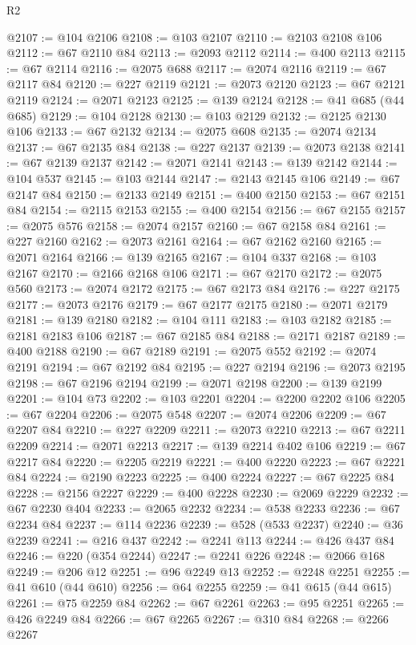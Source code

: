 \begin{lexlean}{R2}
\begin{coremodule}
@2107 := @104 @2106
@2108 := @103 @2107
@2110 := @2103 @2108 @106
@2112 := @67 @2110 @84
@2113 := @2093 @2112
@2114 := @400 @2113
@2115 := @67 @2114
@2116 := @2075 @688
@2117 := @2074 @2116
@2119 := @67 @2117 @84
@2120 := @227 @2119
@2121 := @2073 @2120
@2123 := @67 @2121 @2119
@2124 := @2071 @2123
@2125 := @139 @2124
@2128 := @41 @685 (@44 @685)
@2129 := @104 @2128
@2130 := @103 @2129
@2132 := @2125 @2130 @106
@2133 := @67 @2132
@2134 := @2075 @608
@2135 := @2074 @2134
@2137 := @67 @2135 @84
@2138 := @227 @2137
@2139 := @2073 @2138
@2141 := @67 @2139 @2137
@2142 := @2071 @2141
@2143 := @139 @2142
@2144 := @104 @537
@2145 := @103 @2144
@2147 := @2143 @2145 @106
@2149 := @67 @2147 @84
@2150 := @2133 @2149
@2151 := @400 @2150
@2153 := @67 @2151 @84
@2154 := @2115 @2153
@2155 := @400 @2154
@2156 := @67 @2155
@2157 := @2075 @576
@2158 := @2074 @2157
@2160 := @67 @2158 @84
@2161 := @227 @2160
@2162 := @2073 @2161
@2164 := @67 @2162 @2160
@2165 := @2071 @2164
@2166 := @139 @2165
@2167 := @104 @337
@2168 := @103 @2167
@2170 := @2166 @2168 @106
@2171 := @67 @2170
@2172 := @2075 @560
@2173 := @2074 @2172
@2175 := @67 @2173 @84
@2176 := @227 @2175
@2177 := @2073 @2176
@2179 := @67 @2177 @2175
@2180 := @2071 @2179
@2181 := @139 @2180
@2182 := @104 @111
@2183 := @103 @2182
@2185 := @2181 @2183 @106
@2187 := @67 @2185 @84
@2188 := @2171 @2187
@2189 := @400 @2188
@2190 := @67 @2189
@2191 := @2075 @552
@2192 := @2074 @2191
@2194 := @67 @2192 @84
@2195 := @227 @2194
@2196 := @2073 @2195
@2198 := @67 @2196 @2194
@2199 := @2071 @2198
@2200 := @139 @2199
@2201 := @104 @73
@2202 := @103 @2201
@2204 := @2200 @2202 @106
@2205 := @67 @2204
@2206 := @2075 @548
@2207 := @2074 @2206
@2209 := @67 @2207 @84
@2210 := @227 @2209
@2211 := @2073 @2210
@2213 := @67 @2211 @2209
@2214 := @2071 @2213
@2217 := @139 @2214 @402 @106
@2219 := @67 @2217 @84
@2220 := @2205 @2219
@2221 := @400 @2220
@2223 := @67 @2221 @84
@2224 := @2190 @2223
@2225 := @400 @2224
@2227 := @67 @2225 @84
@2228 := @2156 @2227
@2229 := @400 @2228
@2230 := @2069 @2229
@2232 := @67 @2230 @404
@2233 := @2065 @2232
@2234 := @538 @2233
@2236 := @67 @2234 @84
@2237 := @114 @2236
@2239 := @528 (@533 @2237)
@2240 := @36 @2239
@2241 := @216 @437
@2242 := @2241 @113
@2244 := @426 @437 @84
@2246 := @220 (@354 @2244)
@2247 := @2241 @226
@2248 := @2066 @168
@2249 := @206 @12
@2251 := @96 @2249 @13
@2252 := @2248 @2251
@2255 := @41 @610 (@44 @610)
@2256 := @64 @2255
@2259 := @41 @615 (@44 @615)
@2261 := @75 @2259 @84
@2262 := @67 @2261
@2263 := @95 @2251
@2265 := @426 @2249 @84
@2266 := @67 @2265
@2267 := @310 @84
@2268 := @2266 @2267

\end{coremodule}
\end{lexlean}
